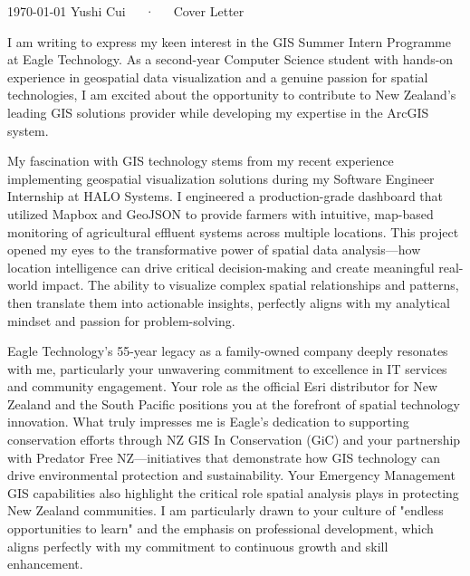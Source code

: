 \documentclass[11pt, a4paper]{awesome-cv}
\begin{document}
\makecvheader[C]

\makecvfooter
  {\today}
  {Yushi Cui~~~·~~~Cover Letter}
  {}

\makelettertitle

\begin{cvletter}

I am writing to express my keen interest in the GIS Summer Intern Programme at Eagle Technology. As a second-year Computer Science student with hands-on experience in geospatial data visualization and a genuine passion for spatial technologies, I am excited about the opportunity to contribute to New Zealand's leading GIS solutions provider while developing my expertise in the ArcGIS system.

My fascination with GIS technology stems from my recent experience implementing geospatial visualization solutions during my Software Engineer Internship at HALO Systems. I engineered a production-grade dashboard that utilized Mapbox and GeoJSON to provide farmers with intuitive, map-based monitoring of agricultural effluent systems across multiple locations. This project opened my eyes to the transformative power of spatial data analysis—how location intelligence can drive critical decision-making and create meaningful real-world impact. The ability to visualize complex spatial relationships and patterns, then translate them into actionable insights, perfectly aligns with my analytical mindset and passion for problem-solving.

Eagle Technology's 55-year legacy as a family-owned company deeply resonates with me, particularly your unwavering commitment to excellence in IT services and community engagement. Your role as the official Esri distributor for New Zealand and the South Pacific positions you at the forefront of spatial technology innovation. What truly impresses me is Eagle's dedication to supporting conservation efforts through NZ GIS In Conservation (GiC) and your partnership with Predator Free NZ—initiatives that demonstrate how GIS technology can drive environmental protection and sustainability. Your Emergency Management GIS capabilities also highlight the critical role spatial analysis plays in protecting New Zealand communities. I am particularly drawn to your culture of "endless opportunities to learn" and the emphasis on professional development, which aligns perfectly with my commitment to continuous growth and skill enhancement.


\end{cvletter}
\end{document}
